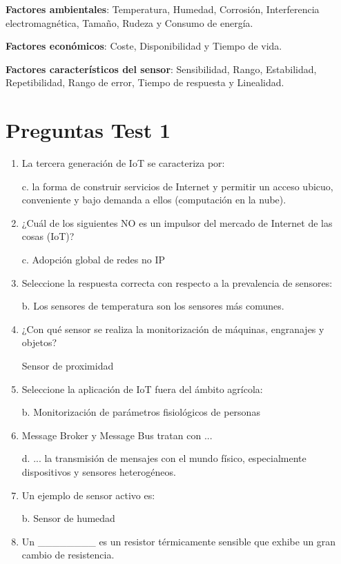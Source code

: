 \documentclass[12pt, twoside, openright]{report} %
\begin{document}
\textbf{Factores ambientales}: Temperatura, Humedad, Corrosión,
Interferencia electromagnética, Tamaño, Rudeza y Consumo de energía.

\textbf{Factores económicos}: Coste, Disponibilidad y Tiempo de vida.

\textbf{Factores característicos del sensor}: Sensibilidad, Rango,
Estabilidad, Repetibilidad, Rango de error, Tiempo de respuesta y
Linealidad.

\section{Preguntas Test 1}
\begin{enumerate}
	\item La tercera generación de IoT se caracteriza por:

	      c. la forma de construir servicios de Internet y permitir un acceso ubicuo, conveniente y bajo demanda a ellos (computación en la nube).

	\item ¿Cuál de los siguientes NO es un impulsor del mercado de Internet de las cosas (IoT)?

	      c. Adopción global de redes no IP

	\item Seleccione la respuesta correcta con respecto a la prevalencia de sensores:

	      b. Los sensores de temperatura son los sensores más comunes.

	\item ¿Con qué sensor se realiza la monitorización de máquinas, engranajes y objetos?

	      Sensor de proximidad

	\item Seleccione la aplicación de IoT fuera del ámbito agrícola:

	      b. Monitorización de parámetros fisiológicos de personas

	\item Message Broker y Message Bus tratan con ...

	      d. ... la transmisión de mensajes con el mundo físico, especialmente dispositivos y sensores heterogéneos.

	\item Un ejemplo de sensor activo es:

	      b. Sensor de humedad

	\item Un \_\_\_\_\_\_\_\_ es un resistor térmicamente sensible que exhibe un gran cambio de resistencia.


\end{enumerate}
\end{document}
